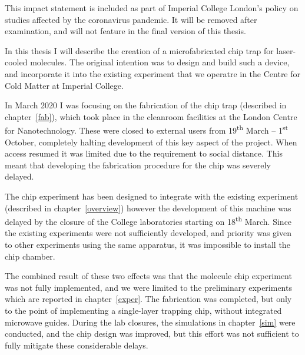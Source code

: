 This impact statement is included as part of Imperial College London's policy
on studies affected by the coronavirus pandemic. It will be removed after
examination, and will not feature in the final version of this thesis.

In this thesis I will describe the creation of a microfabricated chip trap for
laser-cooled \CaF{} molecules. The original intention was to design and build
such a device, and incorporate it into the existing \CaF{} experiment that we
operatre in the Centre for Cold Matter at Imperial College.

In March 2020 I was focusing on the fabrication of the
chip trap (described in chapter~\ref{fab}), which took place in the cleanroom
facilities at the London Centre for Nanotechnology. These were closed to
external users from 19\textsuperscript{th} March -- 1\textsuperscript{st}
October, completely halting development of this key aspect of the project. When
access resumed it was limited due to the requirement to social distance. This
meant that developing the fabrication procedure for the chip was severely
delayed.

The chip experiment has been designed to integrate with the existing \CaF{}
experiment (described in chapter~\ref{overview}) however the development of
this machine was delayed by the closure of the College laboratories starting on
18\textsuperscript{th} March. Since the existing experiments were not
sufficiently developed, and priority was given to other experiments using the
same apparatus, it was impossible to install the chip chamber. 

The combined result of these two effects was that the molecule chip experiment
was not fully implemented, and we were limited to the preliminary experiments
which are reported in chapter~\ref{exper}. The fabrication was completed, but
only to the point of implementing a single-layer trapping chip, without
integrated microwave guides. During the lab closures, the simulations in
chapter~\ref{sim} were conducted, and the chip design was improved, but this
effort was not sufficient to fully mitigate these considerable delays.
